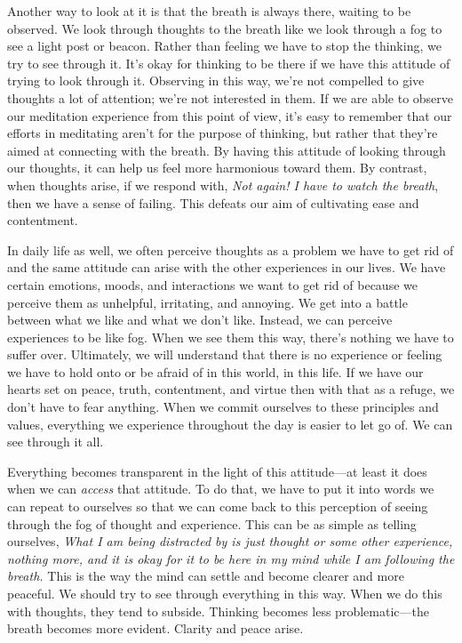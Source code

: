 Another way to look at it is that the breath is always there, waiting 
to be observed. We look through thoughts to the breath like we look 
through a fog to see a light post or beacon. Rather than feeling we 
have to stop the thinking, we try to see through it. It's okay for 
thinking to be there if we have this attitude of trying to look through 
it. Observing in this way, we're not compelled to give thoughts a lot 
of attention; we're not interested in them. If we are able to observe 
our meditation experience from this point of view, it's easy to 
remember that our efforts in meditating aren't for the purpose of 
thinking, but rather that they're aimed at connecting with the breath. 
By having this attitude of looking through our thoughts, it can help us 
feel more harmonious toward them. By contrast, when thoughts arise, if 
we respond with, \emph{Not again! I have to watch the breath}, then we 
have a sense of failing. This defeats our aim of cultivating ease and 
contentment.

In daily life as well, we often perceive thoughts as a problem we have 
to get rid of and the same attitude can arise with the other 
experiences in our lives. We have certain emotions, moods, and 
interactions we want to get rid of because we perceive them as 
unhelpful, irritating, and annoying. We get into a battle between what 
we like and what we don't like. Instead, we can perceive experiences to 
be like fog. When we see them this way, there's nothing we have to 
suffer over. Ultimately, we will understand that there is no experience 
or feeling we have to hold onto or be afraid of in this world, in this 
life. If we have our hearts set on peace, truth, contentment, and 
virtue then with that as a refuge, we don't have to fear anything. When 
we commit ourselves to these principles and values, everything we 
experience throughout the day is easier to let go of. We can see 
through it all.

Everything becomes transparent in the light of this attitude---at least 
it does when we can \emph{access} that attitude. To do that, we have to 
put it into words we can repeat to ourselves so that we can come back 
to this perception of seeing through the fog of thought and experience. 
This can be as simple as telling ourselves, \emph{What I am being 
distracted by is just thought or some other experience, nothing more, 
and it is okay for it to be here in my mind while I am following the 
breath.} This is the way the mind can settle and become clearer and 
more peaceful. We should try to see through everything in this way. 
When we do this with thoughts, they tend to subside. Thinking becomes 
less problematic---the breath becomes more evident. Clarity and peace 
arise.

